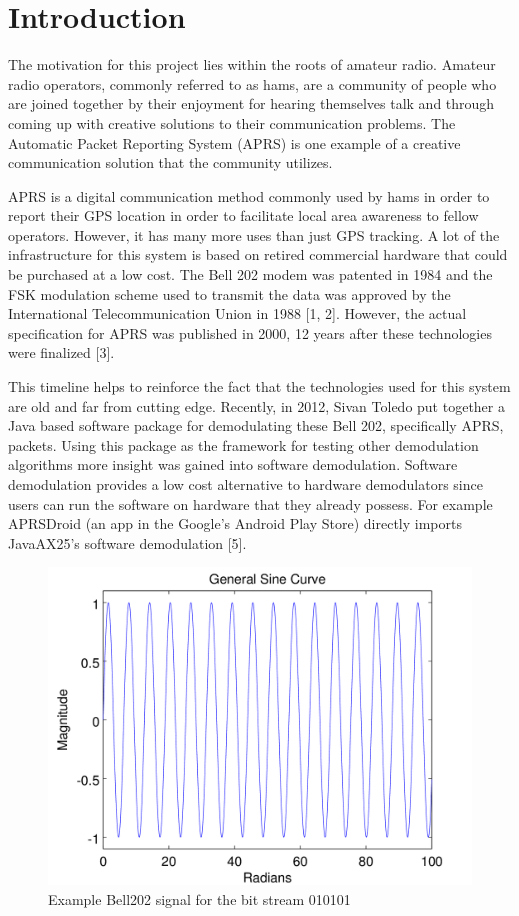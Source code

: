 \chapter{Introduction}

The motivation for this project lies within the roots of amateur radio. Amateur radio operators, commonly referred to as hams, are a community of people who are joined together by their enjoyment for hearing themselves talk and through coming up with creative solutions to their communication problems. The Automatic Packet Reporting System (APRS) is one example of a creative communication solution that the community utilizes.

APRS is a digital communication method commonly used by hams in order to report their GPS location in order to facilitate local area awareness to fellow operators. However, it has many more uses than just GPS tracking. A lot of the infrastructure for this system is based on retired commercial hardware that could be purchased at a low cost. The Bell 202 modem was patented in 1984 and the FSK modulation scheme used to transmit the data was approved by the International Telecommunication Union in 1988 [1, 2]. However, the actual specification for APRS was published in 2000, 12 years after these technologies were finalized [3].

This timeline helps to reinforce the fact that the technologies used for this system are old and far from cutting edge. Recently, in 2012, Sivan Toledo put together a Java based software package for demodulating these Bell 202, specifically APRS, packets. Using this package as the framework for testing other demodulation algorithms more insight was gained into software demodulation. Software demodulation provides a low cost alternative to hardware demodulators since users can run the software on hardware that they already possess. For example APRSDroid (an app in the Google’s Android Play Store) directly imports JavaAX25’s software demodulation [5]. 

\begin{figure}
  \centering
  \includegraphics[width=0.75\linewidth]{images/GeneralSineCurve.png}
  \caption{Example Bell202 signal for the bit stream 010101}
\end{figure}

